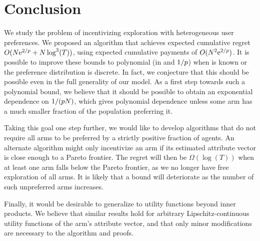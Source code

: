 \section{Conclusion}
We study the problem of incentivizing exploration with heterogeneous
user preferences.
We proposed an algorithm that achieves expected cumulative regret
$O(N \mathrm{e}^{2/p} + N \log^3(T))$,
using expected cumulative payments of $O(N^2 \mathrm{e}^{2/p})$.
It is possible to improve these bounds to polynomial (in \ARMNUM and
$1/p$) when \MinProb is known or the preference distribution is
discrete.
In fact, we conjecture that this should be possible even in the full
generality of our model.
As a first step towards such a polynomial bound, we believe that it
should be possible to obtain an exponential dependence on
$1/(p N)$, which gives polynomial dependence unless some
arm has a much smaller fraction of the population preferring it.

Taking this goal one step further, we would like to 
develop algorithms that do not require all arms to be preferred by a
strictly positive fraction of agents.
An alternate algorithm might only incentivize an arm if its estimated
attribute vector is close enough to a Pareto frontier.
The regret will then be $\Omega(\log(T))$ when at least one arm falls
below the Pareto frontier, as we no longer have free exploration of
all arms. 
It is likely that a bound will deteriorate as the number of such
unpreferred arms increases.

Finally, it would be desirable to generalize to utility
functions beyond inner products.
We believe that similar results hold for arbitrary
Lipschitz-continuous utility functions of the arm's attribute vector,
and that only minor modifications are necessary to the algorithm and
proofs.
